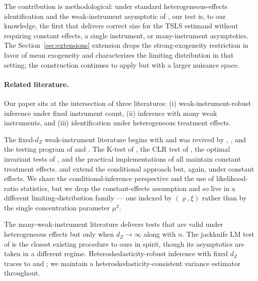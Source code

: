 The contribution is methodological: under standard heterogeneous-effects identification \citep{angristTwoStageLeastSquares1995, angristInterpretationInstrumentalVariables2000} and the weak-instrument asymptotic of \cite{staigerInstrumentalVariablesRegression1997}, our test is, to our knowledge, the first that delivers correct size for the TSLS estimand without requiring constant effects, a single instrument, or many-instrument asymptotics. The Section~\ref{sec:extensions} extension drops the strong-exogeneity restriction in favor of mean exogeneity and characterizes the limiting distribution in that setting; the construction continues to apply but with a larger nuisance space.

\paragraph*{Related literature.}
Our paper sits at the intersection of three literatures: (i) weak-instrument-robust inference under fixed instrument count, (ii) inference with many weak instruments, and (iii) identification under heterogeneous treatment effects.

The fixed-$d_Z$ weak-instrument literature begins with \cite{andersonEstimationParametersSingle1949} and was revived by \cite{staigerInstrumentalVariablesRegression1997}, \cite{boundProblemsInstrumentalVariables1995}, and the testing program of \cite{stockSurveyWeakInstruments2002} and \cite{stockTestingWeakInstruments2005}. The K-test of \cite{kleibergenGeneralizingWeakInstrument2007}, the CLR test of \cite{moreiraConditionalLikelihoodRatio2003}, the optimal invariant tests of \cite{andrewsOptimalTwoSidedInvariant2006}, and the practical implementations of \cite{finlayImplementingWeakInstrumentRobust2009} all maintain constant treatment effects. \cite{moreiraTestsCorrectSize2009} and \cite{andrewsConditionalLinearCombination2016} extend the conditional approach but, again, under constant effects. We share the conditional-inference perspective and the use of likelihood-ratio statistics, but we drop the constant-effects assumption and so live in a different limiting-distribution family — one indexed by $(\varrho, \xi)$ rather than by the single concentration parameter $\mu^2$.

The many-weak-instrument literature \citep{chaoConsistentEstimationLarge2005, chaoAsymptoticDistributionJive2012, mikushevaInferenceManyWeak2022, mikushevaWeakIdentificationMany2024, yapInferenceManyWeak2025} delivers tests that are valid under heterogeneous effects but only when $d_Z \to \infty$ along with $n$. The jackknife LM test of \cite{yapInferenceManyWeak2025} is the closest existing procedure to ours in spirit, though its asymptotics are taken in a different regime. Heteroskedasticity-robust inference with fixed $d_Z$ traces to \cite{kolesarEstimationInstrumentalVariables2013} and \cite{evdokimovInferenceInstrumentalVariables2018}; we maintain a heteroskedasticity-consistent variance estimator throughout.

